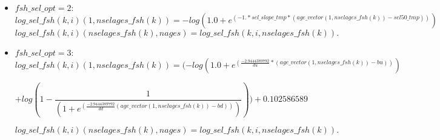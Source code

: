 \documentclass{article}
\begin{document}
\begin{itemize}
\item $fsh\_sel\_opt=2:$ 
\begin{equation}
            log\_sel\_fsh(k,i)(1,nselages\_fsh(k))=-log( 1.0 + e^{(-1.*sel\_slope\_tmp * ( age\_vector(1,nselages\_fsh(k)) - sel50\_tmp) )})
        \end{equation}
        \begin{equation}
            log\_sel\_fsh(k,i)(nselages\_fsh(k),nages)=log\_sel\_fsh(k,i,nselages\_fsh(k)).
        \end{equation}
\item $fsh\_sel\_opt=3:$
 \begin{equation}
        log\_sel\_fsh(k,i)(1,nselages\_fsh(k))     = ( -log(1.0 + e^{(\frac{-2.9444389792}{du} * ( age\_vector(1,nselages\_fsh(k)) - bu) )})
    \end{equation}
    
    \begin{equation*}
         +log(1 - \dfrac{1}{(1 + e^{(\frac{-2.9444389792}{dd} ( age\_vector(1,nselages\_fsh(k)) - bd))})} ) )+0.102586589 
    \end{equation*}
    
    \begin{equation}
        log\_sel\_fsh(k,i)(nselages\_fsh(k),nages) = log\_sel\_fsh(k,i,nselages\_fsh(k)).
    \end{equation}
    \end{itemize}
\end{document}
